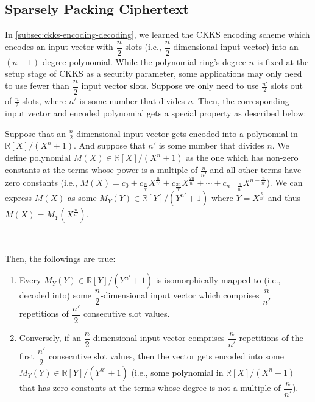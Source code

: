 \subsection{Sparsely Packing Ciphertext}
\label{subsec:ckks-sparse-packing}

In \autoref{subsec:ckks-encoding-decoding}, we learned the CKKS encoding scheme which encodes an input vector with $\dfrac{n}{2}$ slots (i.e., $\dfrac{n}{2}$-dimensional input vector) into an $(n-1)$-degree polynomial. While the polynomial ring's degree $n$ is fixed at the setup stage of CKKS as a security parameter, some applications may only need to use fewer than $\dfrac{n}{2}$ input vector slots. Suppose we only need to use $\frac{n'}{2}$ slots out of $\frac{n}{2}$ slots, where $n'$ is some number that divides $n$. Then, the corresponding input vector and encoded polynomial gets a special property as described below:


\begin{tcolorbox}[title={\textbf{\tboxlabel{\ref*{subsec:ckks-sparse-packing}} CKKS's Sparsely Packing Polynomial and Ciphertext}}]

Suppose that an $\frac{n}{2}$-dimensional input vector gets encoded into a polynomial in $\mathbb{R}[X] / (X^n + 1)$. And suppose that $n'$ is some number that divides $n$. We define polynomial $M(X) \in \mathbb{R}[X] / (X^n + 1)$ as the one which has non-zero constants at the terms whose power is a multiple of $\frac{n}{n'}$ and all other terms have zero constants (i.e., $M(X) = c_0 + c_{\frac{n}{n'}}X^{\frac{n}{n'}} + c_{\frac{2n}{n'}}X^{\frac{2n}{n'}} + \cdots + c_{n - \frac{n}{n'}}X^{n - \frac{n}{n'}}$). We can express $M(X)$ as some $M_Y(Y) \in \mathbb{R}[Y] / (Y^{n'} + 1)$ where $Y = X^{\frac{n}{n'}}$ and thus $M(X) = M_Y(X^{\frac{n}{n'}})$. 

$ $

Then, the followings are true:

\begin{enumerate}
    \item Every $M_Y(Y) \in \mathbb{R}[Y]/(Y^{n'} + 1)$ is isomorphically mapped to (i.e., decoded into) some $\dfrac{n}{2}$-dimensional input vector which comprises $\dfrac{n}{n'}$ repetitions of $\dfrac{n'}{2}$ consecutive slot values.
    \item Conversely, if an $\dfrac{n}{2}$-dimensional input vector comprises $\dfrac{n}{n'}$ repetitions of the first $\dfrac{n'}{2}$ consecutive slot values, then the vector gets encoded into some $M_Y(Y) \in \mathbb{R}[Y] / (Y^{n'} + 1)$ (i.e., some polynomial in $\mathbb{R}[X] / (X^n + 1)$ that has zero constants at the terms whose degree is not a multiple of $\dfrac{n}{n'}$). 
\end{enumerate}

\end{tcolorbox}

